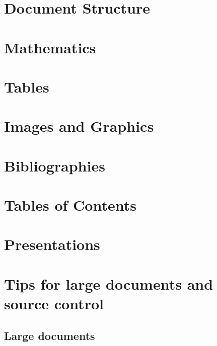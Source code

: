   \section{Document Structure}

  \section{Mathematics}

  \section{Tables}

  \section{Images and Graphics}

  \section{Bibliographies}

  \section{Tables of Contents}

  \section{Presentations}

  \section{Tips for large documents and source control}
  \subsection{Large documents}

